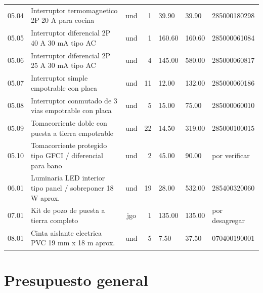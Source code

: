 \begin{landscape}
\begin{longtable}{c L{6.2cm} c r R{1.8cm} R{1.8cm} L{2.8cm}}
05.04 & Interruptor termomagnetico 2P 20 A para cocina & und & 1 & 39.90 & 39.90 & 285000180298 \\
05.05 & Interruptor diferencial 2P 40 A 30 mA tipo AC & und & 1 & 160.60 & 160.60 & 285000061084 \\
05.06 & Interruptor diferencial 2P 25 A 30 mA tipo AC & und & 4 & 145.00 & 580.00 & 285000060817 \\
05.07 & Interruptor simple empotrable con placa & und & 11 & 12.00 & 132.00 & 285000060186 \\
05.08 & Interruptor conmutado de 3 vias empotrable con placa & und & 5 & 15.00 & 75.00 & 285000060010 \\
05.09 & Tomacorriente doble con puesta a tierra empotrable & und & 22 & 14.50 & 319.00 & 285000100015 \\
05.10 & Tomacorriente protegido tipo GFCI / diferencial para bano & und & 2 & 45.00 & 90.00 & por verificar \\
06.01 & Luminaria LED interior tipo panel / sobreponer 18 W aprox. & und & 19 & 28.00 & 532.00 & 285400320060 \\
07.01 & Kit de pozo de puesta a tierra completo & jgo & 1 & 135.00 & 135.00 & por desagregar \\
08.01 & Cinta aislante electrica PVC 19 mm x 18 m aprox. & und & 5 & 7.50 & 37.50 & 070400190001 \\
\bottomrule
\end{longtable}
\end{landscape}

\clearpage

\section{Presupuesto general}

